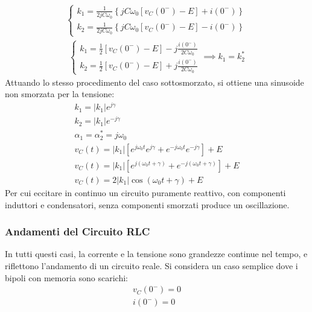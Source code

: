 \documentclass{article}
\numberwithin{equation}{subsection}
\begin{document}
\begin{gather*}
    \begin{cases}
        k_1=\displaystyle\frac{1}{2jC\omega_0}\left\{jC\omega_0\left[v_C(0^-)-E\right]+i(0^-)\right\}\\
        k_2=\displaystyle\frac{1}{2jC\omega_0}\left\{jC\omega_0\left[v_C(0^-)-E\right]-i(0^-)\right\}
    \end{cases}
\end{gather*}
\begin{gather*}
    \begin{cases}
        k_1=\displaystyle\frac{1}{2}\left[v_C(0^-)-E\right]-j\frac{i(0^-)}{2C\omega_0}\\
        k_2=\displaystyle\frac{1}{2}\left[v_C(0^-)-E\right]+j\frac{i(0^-)}{2C\omega_0}
    \end{cases}\implies k_1=k_2^*
\end{gather*}
Attuando lo stesso procedimento del caso sottosmorzato, si ottiene una sinusoide non smorzata per la tensione:
\begin{gather*}
    k_1=|k_1|e^{j\gamma}\\
    k_2=|k_1|e^{-j\gamma}\\
    \alpha_1=\alpha_2^*=j\omega_0\\
    v_C(t)=|k_1|\left[e^{j\omega_0t}e^{j\gamma}+e^{-j\omega_0t}e^{-j\gamma}\right]+E\\
    v_C(t)=|k_1|\left[e^{j(\omega_0t+\gamma)}+e^{-j(\omega_0t+\gamma)}\right]+E\\
    v_C(t)=2|k_1|\cos(\omega_0t+\gamma)+E
\end{gather*}
Per cui eccitare in continuo un circuito puramente reattivo, con componenti induttori e condensatori, senza componenti smorzati produce un oscillazione. 

\subsubsection{Andamenti del Circuito RLC}
In tutti questi casi, la corrente e la tensione sono grandezze continue nel tempo, e riflettono l'andamento di un circuito reale. Si considera un caso semplice dove i 
bipoli con memoria sono scarichi:
\begin{gather*}
    v_C(0^-)=0\\
    i(0^-)=0
\end{gather*}
\end{document}
